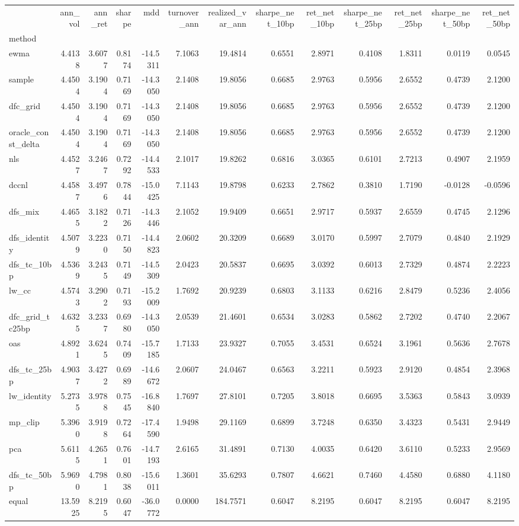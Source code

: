 \begin{tabular}{lrrrrrrrrrrrr}
\toprule
 & ann_vol & ann_ret & sharpe & mdd & turnover_ann & realized_var_ann & sharpe_net_10bp & ret_net_10bp & sharpe_net_25bp & ret_net_25bp & sharpe_net_50bp & ret_net_50bp \\
method &  &  &  &  &  &  &  &  &  &  &  &  \\
\midrule
ewma & 4.4138 & 3.6077 & 0.8174 & -14.5311 & 7.1063 & 19.4814 & 0.6551 & 2.8971 & 0.4108 & 1.8311 & 0.0119 & 0.0545 \\
sample & 4.4504 & 3.1904 & 0.7169 & -14.3050 & 2.1408 & 19.8056 & 0.6685 & 2.9763 & 0.5956 & 2.6552 & 0.4739 & 2.1200 \\
dfc_grid & 4.4504 & 3.1904 & 0.7169 & -14.3050 & 2.1408 & 19.8056 & 0.6685 & 2.9763 & 0.5956 & 2.6552 & 0.4739 & 2.1200 \\
oracle_const_delta & 4.4504 & 3.1904 & 0.7169 & -14.3050 & 2.1408 & 19.8056 & 0.6685 & 2.9763 & 0.5956 & 2.6552 & 0.4739 & 2.1200 \\
nls & 4.4527 & 3.2467 & 0.7292 & -14.4533 & 2.1017 & 19.8262 & 0.6816 & 3.0365 & 0.6101 & 2.7213 & 0.4907 & 2.1959 \\
dccnl & 4.4587 & 3.4976 & 0.7844 & -15.0425 & 7.1143 & 19.8798 & 0.6233 & 2.7862 & 0.3810 & 1.7190 & -0.0128 & -0.0596 \\
dfs_mix & 4.4655 & 3.1822 & 0.7126 & -14.3446 & 2.1052 & 19.9409 & 0.6651 & 2.9717 & 0.5937 & 2.6559 & 0.4745 & 2.1296 \\
dfs_identity & 4.5079 & 3.2230 & 0.7150 & -14.4823 & 2.0602 & 20.3209 & 0.6689 & 3.0170 & 0.5997 & 2.7079 & 0.4840 & 2.1929 \\
dfs_tc_10bp & 4.5369 & 3.2435 & 0.7149 & -14.5309 & 2.0423 & 20.5837 & 0.6695 & 3.0392 & 0.6013 & 2.7329 & 0.4874 & 2.2223 \\
lw_cc & 4.5743 & 3.2902 & 0.7193 & -15.2009 & 1.7692 & 20.9239 & 0.6803 & 3.1133 & 0.6216 & 2.8479 & 0.5236 & 2.4056 \\
dfc_grid_tc25bp & 4.6325 & 3.2337 & 0.6980 & -14.3050 & 2.0539 & 21.4601 & 0.6534 & 3.0283 & 0.5862 & 2.7202 & 0.4740 & 2.2067 \\
oas & 4.8921 & 3.6245 & 0.7409 & -15.7185 & 1.7133 & 23.9327 & 0.7055 & 3.4531 & 0.6524 & 3.1961 & 0.5636 & 2.7678 \\
dfs_tc_25bp & 4.9037 & 3.4272 & 0.6989 & -14.6672 & 2.0607 & 24.0467 & 0.6563 & 3.2211 & 0.5923 & 2.9120 & 0.4854 & 2.3968 \\
lw_identity & 5.2735 & 3.9788 & 0.7545 & -16.8840 & 1.7697 & 27.8101 & 0.7205 & 3.8018 & 0.6695 & 3.5363 & 0.5843 & 3.0939 \\
mp_clip & 5.3960 & 3.9198 & 0.7264 & -17.4590 & 1.9498 & 29.1169 & 0.6899 & 3.7248 & 0.6350 & 3.4323 & 0.5431 & 2.9449 \\
pca & 5.6115 & 4.2651 & 0.7601 & -14.7193 & 2.6165 & 31.4891 & 0.7130 & 4.0035 & 0.6420 & 3.6110 & 0.5233 & 2.9569 \\
dfs_tc_50bp & 5.9690 & 4.7981 & 0.8038 & -15.6011 & 1.3601 & 35.6293 & 0.7807 & 4.6621 & 0.7460 & 4.4580 & 0.6880 & 4.1180 \\
equal & 13.5925 & 8.2195 & 0.6047 & -36.0772 & 0.0000 & 184.7571 & 0.6047 & 8.2195 & 0.6047 & 8.2195 & 0.6047 & 8.2195 \\
\bottomrule
\end{tabular}
